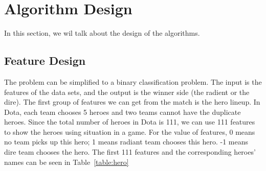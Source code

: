 \section{Algorithm Design}
In this section, we wil talk about the design of the algorithms.
\subsection{Feature Design}
The problem can be simplified to a binary classification problem.
The input is the features of the data sets, and the output is the winner side (the radient or the dire).
The first group of features we can get from the match is the hero lineup.
In Dota, each team chooses 5 heroes and two teams cannot have the duplicate heroes.
Since the total number of heroes in Dota is 111, we can use 111 features to show the heroes using situation in a game.
For the value of features, 0 means no team picks up this hero;
1 means radiant team chooses this hero.
-1 means dire team chooses the hero.
The first 111 features and the corresponding heroes' names can be seen in Table~\ref{table:hero}

